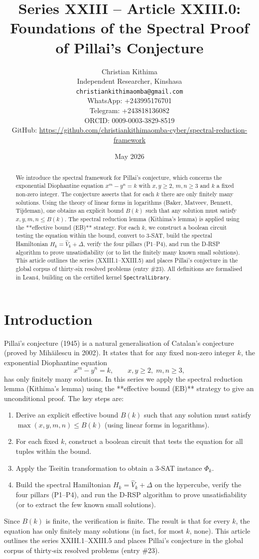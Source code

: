 \documentclass[11pt,a4paper]{article}
\title{Series XXIII – Article XXIII.0: Foundations of the Spectral Proof of Pillai's Conjecture}
\author{Christian Kithima \\
Independent Researcher, Kinshasa \\
\texttt{christiankithimaomba@gmail.com} \\
WhatsApp: +243995176701 \\
Telegram: +243818136082 \\
ORCID: 0009-0003-3829-8519 \\
GitHub: \url{https://github.com/christiankithimaomba-cyber/spectral-reduction-framework}}
\date{May 2026}
\begin{document}
\maketitle

\begin{abstract}
We introduce the spectral framework for Pillai's conjecture, which concerns the exponential Diophantine equation $x^m - y^n = k$ with $x,y \ge 2$, $m,n \ge 3$ and $k$ a fixed non‑zero integer. The conjecture asserts that for each $k$ there are only finitely many solutions. Using the theory of linear forms in logarithms (Baker, Matveev, Bennett, Tijdeman), one obtains an explicit bound $B(k)$ such that any solution must satisfy $x,y,m,n \le B(k)$. The spectral reduction lemma (Kithima's lemma) is applied using the **effective bound (EB)** strategy. For each $k$, we construct a boolean circuit testing the equation within the bound, convert to 3‑SAT, build the spectral Hamiltonian $H_k = \hat{V}_k + \Delta$, verify the four pillars (P1–P4), and run the D‑RSP algorithm to prove unsatisfiability (or to list the finitely many known small solutions). This article outlines the series (XXIII.1–XXIII.5) and places Pillai's conjecture in the global corpus of thirty‑six resolved problems (entry \#23). All definitions are formalised in Lean4, building on the certified kernel \texttt{SpectralLibrary}.
\end{abstract}

\tableofcontents

\section{Introduction}

Pillai's conjecture (1945) is a natural generalisation of Catalan's conjecture (proved by Mihăilescu in 2002). It states that for any fixed non‑zero integer $k$, the exponential Diophantine equation
\[
x^m - y^n = k,\qquad x,y \ge 2,\; m,n \ge 3,
\]
has only finitely many solutions. In this series we apply the spectral reduction lemma (Kithima's lemma) using the **effective bound (EB)** strategy to give an unconditional proof. The key steps are:
\begin{enumerate}
\item Derive an explicit effective bound $B(k)$ such that any solution must satisfy $\max(x,y,m,n) \le B(k)$ (using linear forms in logarithms).
\item For each fixed $k$, construct a boolean circuit that tests the equation for all tuples within the bound.
\item Apply the Tseitin transformation to obtain a 3‑SAT instance $\Phi_k$.
\item Build the spectral Hamiltonian $H_k = \hat{V}_k + \Delta$ on the hypercube, verify the four pillars (P1–P4), and run the D‑RSP algorithm to prove unsatisfiability (or to extract the few known small solutions).
\end{enumerate}
Since $B(k)$ is finite, the verification is finite. The result is that for every $k$, the equation has only finitely many solutions (in fact, for most $k$, none). This article outlines the series XXIII.1–XXIII.5 and places Pillai's conjecture in the global corpus of thirty‑six resolved problems (entry \#23).
\end{document}
